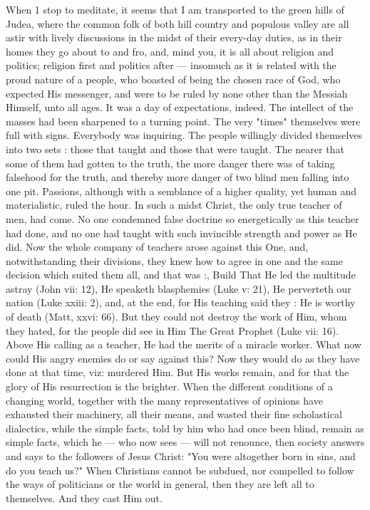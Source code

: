 When 1 stop to meditate, it seems that I am 
transported to the green hills of Judea, where 
the common folk of both hill country and populous
valley are all astir with lively discussions 
in the midst of their every-day duties, as in their 
homes they go about to and fro, and, mind you, 
it is all about religion and politics; religion first 
and politics after — insomuch as it is related with 
the proud nature of a people, who boasted of 
being the chosen race of God, who expected His 
messenger, and were to be ruled by none other 
than the Messiah Himself, unto all ages. It 
was a day of expectations, indeed. The intellect 
of the masses had been sharpened to a turning 
point. The very "times" themselves were full 
with signs. Everybody was inquiring. The 
people willingly divided themselves into two 
sets : those that taught and those that were 
taught. The nearer that some of them had gotten
to the truth, the more danger there was of
taking falsehood for the truth, and thereby more 
danger of two blind men falling into one pit. 
Passions, although with a semblance of a higher 
quality, yet human and materialistic, ruled the 
hour. In such a midst Christ, the only true 
teacher of men, had come. No one condemned 
false doctrine so energetically as this teacher 
had done, and no one had taught with such invincible
strength and power as He did. Now 
the whole company of teachers arose against this 
One, and, notwithstanding their divisions, they 
knew how to agree in one and the same decision 
which suited them all, and that was :, Build That He led 
the multitude astray (John vii: 12), He speaketh
blasphemies (Luke v: 21), He perverteth 
our nation (Luke xxiii: 2), and, at the end, for 
His teaching said they : He is worthy of death 
(Matt, xxvi: 66). But they could not destroy 
the work of Him, whom they hated, for the people
did see in Him The Great Prophet (Luke 
vii: 16). Above His calling as a teacher, He 
had the merits of a miracle worker. What now 
could His angry enemies do or say against this? 
Now they would do as they have done at that 
time, viz: murdered Him. But His works remain,
and for that the glory of His resurrection 
is the brighter. When the different conditions 
of a changing world, together with the many 
representatives of opinions have exhausted their 
machinery, all their means, and wasted their fine 
scholastical dialectics, while the simple facts, 
told by him who had once been blind, remain as 
simple facts, which he — who now sees — will not 
renounce, then society answers and says to the 
followers of Jesus Christ: "You were altogether 
born in sins, and do you teach us?" When Christians
cannot be subdued, nor compelled to follow 
the ways of politicians or the world in general, 
then they are left all to themselves. And they 
cast Him out. 

